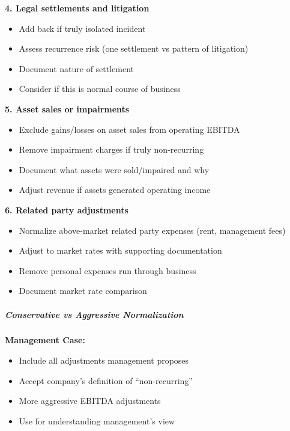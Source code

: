 \documentclass[11pt]{article}
\begin{document}
\textbf{4. Legal settlements and litigation}

\begin{itemize}[leftmargin=*,itemsep=2pt,topsep=2pt]
\item {} Add back if truly isolated incident
\item {} Assess recurrence risk (one settlement vs pattern of litigation)
\item {} Document nature of settlement
\item {} Consider if this is normal course of business
\end{itemize}

\textbf{5. Asset sales or impairments}

\begin{itemize}[leftmargin=*,itemsep=2pt,topsep=2pt]
\item {} Exclude gains/losses on asset sales from operating EBITDA
\item {} Remove impairment charges if truly non-recurring
\item {} Document what assets were sold/impaired and why
\item {} Adjust revenue if assets generated operating income
\end{itemize}

\textbf{6. Related party adjustments}

\begin{itemize}[leftmargin=*,itemsep=2pt,topsep=2pt]
\item {} Normalize above-market related party expenses (rent, management fees)
\item {} Adjust to market rates with supporting documentation
\item {} Remove personal expenses run through business
\item {} Document market rate comparison
\end{itemize}

\subparagraph{Conservative vs Aggressive Normalization}\mbox{}\par

\textbf{Management Case:}

\begin{itemize}[leftmargin=*,itemsep=2pt,topsep=2pt]
\item {} Include all adjustments management proposes
\item {} Accept company's definition of ``non-recurring''
\item {} More aggressive EBITDA adjustments
\item {} Use for understanding management's view
\end{itemize}
\end{document}
